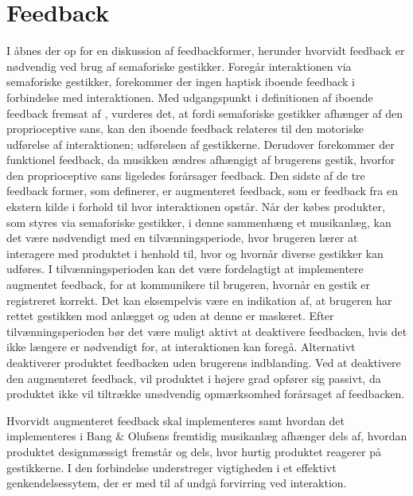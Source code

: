 \section{Feedback}
\label{DiskussionFeedback}
%
I  åbnes der op for en diskussion af feedbackformer, herunder hvorvidt feedback er nødvendig ved brug af semaforiske gestikker. Foregår interaktionen via semaforiske gestikker, forekommer der ingen haptisk iboende feedback i forbindelse med interaktionen. Med udgangspunkt i definitionen af iboende feedback fremsat af \textcite[s. 3]{PDF:InteractionFrogger}, vurderes det, at fordi semaforiske gestikker afhænger af den proprioceptive sans, kan den iboende feedback relateres til den motoriske udførelse af interaktionen; udførelsen af gestikkerne. Derudover forekommer der funktionel feedback, da musikken ændres afhængigt af brugerens gestik, hvorfor den proprioceptive sans ligeledes forårsager feedback. Den sidste af de tre feedback former, som  \textcite[s. 3]{PDF:InteractionFrogger} definerer, er augmenteret feedback, som er feedback fra en ekstern kilde i forhold til hvor interaktionen opstår.\blankline
%
Når der købes produkter, som styres via semaforiske gestikker, i denne sammenhæng et musikanlæg, kan det være nødvendigt med en tilvænningsperiode, hvor brugeren lærer at interagere med produktet i henhold til, hvor og hvornår diverse gestikker kan udføres. I tilvænningsperioden kan det være fordelagtigt at implementere augmentet feedback, for at kommunikere til brugeren, hvornår en gestik er registreret korrekt. Det kan eksempelvis være en indikation af, at brugeren har rettet gestikken mod anlægget og uden at denne er maskeret. Efter tilvænningsperioden bør det være muligt aktivt at deaktivere feedbacken, hvis det ikke længere er nødvendigt for, at interaktionen kan foregå. Alternativt deaktiverer produktet feedbacken uden brugerens indblanding. Ved at deaktivere den augmenteret feedback, vil produktet i højere grad opfører sig passivt, da produktet ikke vil tiltrække unødvendig opmærksomhed forårsaget af feedbacken.

Hvorvidt augmenteret feedback skal implementeres samt hvordan det implementeres i Bang $\&$ Olufsens fremtidig musikanlæg afhænger dels af, hvordan produktet designmæssigt fremstår og dels, hvor hurtig produktet reagerer på gestikkerne. I den forbindelse understreger \textcite[s. 8]{PDF:AChairAsUbiquitousInputDevice} vigtigheden i et effektivt genkendelsessytem, der er med til af undgå forvirring ved interaktion. 

